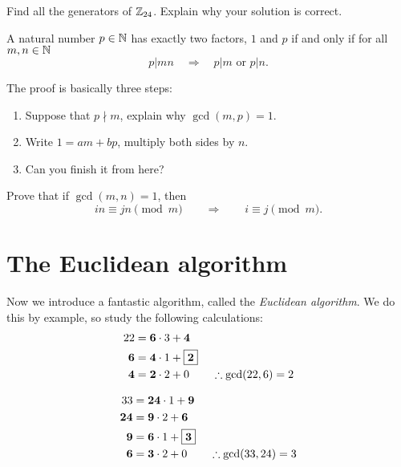 \documentclass{ximera}
\begin{document}
\begin{exercise}
  Find all the generators of $\mathbb Z_{24}$. Explain why your solution is correct.
\end{exercise}





\begin{corollary}\label{E:EL}
  A natural number $p\in \mathbb N$ has exactly two factors, $1$ and $p$ if
  and only if for all $m,n\in\mathbb N$
  \[
  p|mn \quad \Rightarrow \quad p|m \text{ or } p|n.
  \]
  \begin{sketch}
    The proof is basically three steps:
    \begin{enumerate}
    \item Suppose that $p\nmid m$, explain why $\gcd(m,p) =1$.
    \item Write $1 = am + bp$, multiply both sides by $n$.
    \item Can you finish it from here?
    \end{enumerate}
  \end{sketch}
\end{corollary}






\begin{exercise} Prove that if $\gcd(m,n) = 1$, then 
\[
in \equiv jn \pmod m \qquad \Rightarrow\qquad i\equiv j\pmod m.
\]
\end{exercise}



\section{The Euclidean algorithm}

Now we introduce a fantastic algorithm, called the \textit{Euclidean
  algorithm}. We do this by example, so study the following
calculations:
\begin{align*}
  22 &= \boldsymbol{6}\cdot 3 + \boldsymbol{4}\\
  \boldsymbol{6} &= \boldsymbol{4} \cdot 1 + \fbox{$\boldsymbol{2}$}\\
  \boldsymbol{4} &= \boldsymbol{2} \cdot 2 + 0 \qquad
\therefore \gcd(22,6) = 2
\end{align*}

\begin{align*}
33 &= \boldsymbol{24}\cdot 1 + \boldsymbol{9}\\
\boldsymbol{24} &= \boldsymbol{9} \cdot 2 + \boldsymbol{6}\\
\boldsymbol{9} &= \boldsymbol{6} \cdot 1 + \fbox{$\boldsymbol{3}$}\\
\boldsymbol{6} &= \boldsymbol{3} \cdot 2 + 0 \qquad \therefore \gcd(33,24) = 3 
\end{align*}
\end{document}
